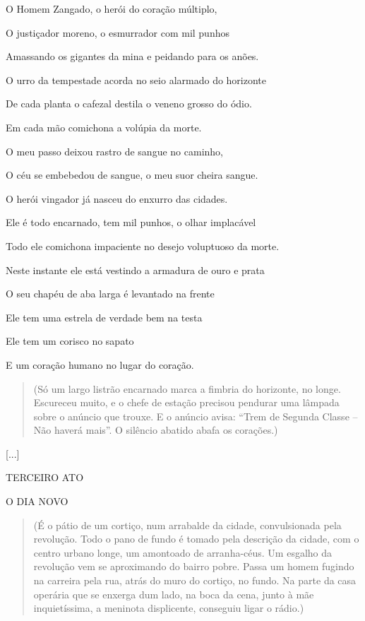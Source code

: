 O Homem Zangado, o herói do coração múltiplo,

O justiçador moreno, o esmurrador com mil punhos

Amassando os gigantes da mina e peidando para os anões.

O urro da tempestade acorda no seio alarmado do horizonte

De cada planta o cafezal destila o veneno grosso do ódio.

Em cada mão comichona a volúpia da morte.

O meu passo deixou rastro de sangue no caminho,

O céu se embebedou de sangue, o meu suor cheira sangue.

O herói vingador já nasceu do enxurro das cidades.

Ele é todo encarnado, tem mil punhos, o olhar implacável

Todo ele comichona impaciente no desejo voluptuoso da morte.

Neste instante ele está vestindo a armadura de ouro e prata

O seu chapéu de aba larga é levantado na frente

Ele tem uma estrela de verdade bem na testa

Ele tem um corisco no sapato

E um coração humano no lugar do coração.

\begin{quote}
(Só um largo listrão encarnado marca a fimbria do horizonte, no longe.
Escureceu muito, e o chefe de estação precisou pendurar uma lâmpada
sobre o anúncio que trouxe. E o anúncio avisa: ``Trem de Segunda Classe
-- Não haverá mais''. O silêncio abatido abafa os corações.)
\end{quote}

{[}...{]}

TERCEIRO ATO

O DIA NOVO

\begin{quote}
(É o pátio de um cortiço, num arrabalde da cidade, convulsionada pela
revolução. Todo o pano de fundo é tomado pela descrição da cidade, com o
centro urbano longe, um amontoado de arranha-céus. Um esgalho da
revolução vem se aproximando do bairro pobre. Passa um homem fugindo na
carreira pela rua, atrás do muro do cortiço, no fundo. Na parte da casa
operária que se enxerga dum lado, na boca da cena, junto à mãe
inquietíssima, a meninota displicente, conseguiu ligar o rádio.)
\end{quote}

